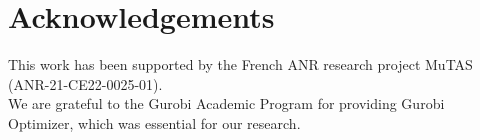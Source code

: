 \documentclass[3p,times,procedia]{elsarticle}
\begin{document}
\section*{Acknowledgements}

This work has been supported by the French ANR research project MuTAS (ANR-21-CE22-0025-01).\\
We are grateful to the Gurobi Academic Program for providing Gurobi Optimizer, which was essential for our research.












\clearpage

\normalMode
\end{document}
